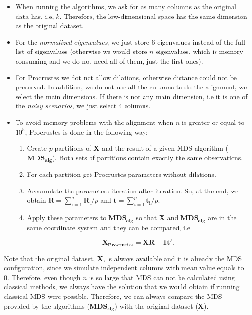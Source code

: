 \documentclass[11pt]{report}
\begin{document}
\begin{itemize}

\item When running the algorithms, we ask for as many columns as the original 
data has, i.e, $k$. Therefore, the low-dimensional space has the same 
dimension as the original dataset.

\item For the \textit{normalized eigenvalues}, we just store 6 eigenvalues 
instead of the full list of eigenvalues (otherwise we would store $n$ 
eigenvalues, which is memory consuming and we do not need all of them, just
the first ones). 

\item For Procrustes we dot not allow dilations, otherwise distance could not
be preserved. In addition, we do not use all the columns 
to do the alignment, we select the main dimensions. If there is not any
main dimension, i.e it is one of the \textit{noisy scenarios}, we just select 4 
columns. 

\item To avoid memory problems with the alignment when $n$ is greater or 
equal to $10^5$, Procrustes is done in the following way:

\begin{enumerate}

\item Create $p$ partitions of \textbf{X} and the result of a given MDS 
algorithm ($\mathbf{MDS_{alg}}$). Both sets of partitions contain exactly the
same observations.


\item For each partition get Procrustes parameters without dilations.

\item Accumulate the parameters iteration after iteration. So, at the end, 
we obtain $\mathbf{R} = \sum_{i = 1}^p \mathbf{R_i}/p$ and 
$\mathbf{t} = \sum_{i = 1}^p \mathbf{t_i}/p$.

\item Apply these parameters to $\mathbf{MDS_{alg}}$ so that 
\textbf{X} and $\mathbf{MDS_{alg}}$ are in the same coordinate system and
they can be compared, i.e

\[
\mathbf{X_{Procrustes}} = \mathbf{X} \mathbf{R} + \mathbf{1t'}.
\]


\end{enumerate}
\end{itemize}


\indent Note that the original dataset, \textbf{X}, is always available and
it is already the MDS configuration, since we simulate independent columns with
mean value equals to 0. Therefore, even though $n$ is so large that MDS can 
not be calculated using classical methods, we always have the solution that 
we would obtain if running classical MDS were possible. Therefore, we can 
always compare the MDS provided by the algorithms ($\mathbf{MDS_{alg}}$) 
with the original dataset (\textbf{X}).
\end{document}
